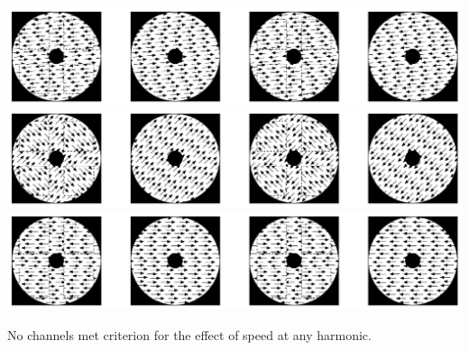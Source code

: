 \documentclass[landscape,final,paperwidth=72in,paperheight=42in,fontscale=0.285]{baposter}
\begin{document}
\begin{poster}
{      \begin{center}
        \includegraphics[scale=0.12]{img/mofo-child-tuning-dir5.jpg}
        \includegraphics[scale=0.12]{img/mofo-child-tuning-dir45.jpg}
        \includegraphics[scale=0.12]{img/mofo-child-tuning-dir180.jpg}

      \end{center}
    }

        {
         No channels met criterion for the effect of speed at any harmonic. 


          \begin{center}

          \end{center}
        }
\end{poster}
\end{document}
